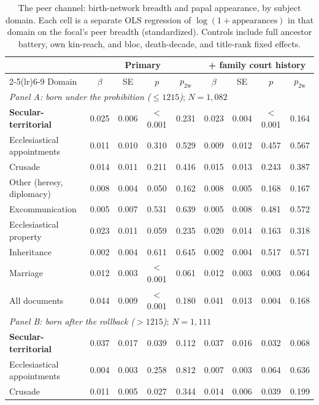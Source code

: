 \documentclass[12pt]{article}
\theoremstyle{definition}
\theoremstyle{remark}
\begin{document}
\begin{table}[!t]
\centering
\caption{The peer channel: birth-network breadth and papal appearance, by subject domain. Each cell is a separate OLS regression of $\log(1+\text{appearances})$ in that domain on the focal's peer breadth (standardized). Controls include full ancestor battery, own kin-reach, and bloc, death-decade, and title-rank fixed effects.}
\label{tab:peer_rf}
{\small
\begin{tabular}{lcccccccc}
\toprule
 & \multicolumn{4}{c}{Primary} & \multicolumn{4}{c}{+ family court history} \\
\cmidrule(lr){2-5}\cmidrule(lr){6-9}
Domain & $\beta$ & SE & $p$ & $p_{\text{2w}}$ & $\beta$ & SE & $p$ & $p_{\text{2w}}$ \\
\midrule
\multicolumn{9}{l}{\textit{Panel A: born under the prohibition ($\leq 1215$)}; $N = 1,082$} \\ \addlinespace
\textbf{Secular-territorial} & 0.025 & 0.006 & $<$0.001 & 0.231 & 0.023 & 0.004 & $<$0.001 & 0.164 \\
Ecclesiastical appointments & 0.011 & 0.010 & 0.310 & 0.529 & 0.009 & 0.012 & 0.457 & 0.567 \\
Crusade & 0.014 & 0.011 & 0.211 & 0.416 & 0.015 & 0.013 & 0.243 & 0.387 \\
Other (heresy, diplomacy) & 0.008 & 0.004 & 0.050 & 0.162 & 0.008 & 0.005 & 0.168 & 0.167 \\
Excommunication & 0.005 & 0.007 & 0.531 & 0.639 & 0.005 & 0.008 & 0.481 & 0.572 \\
Ecclesiastical property & 0.023 & 0.011 & 0.059 & 0.235 & 0.020 & 0.014 & 0.163 & 0.318 \\
Inheritance & 0.002 & 0.004 & 0.611 & 0.645 & 0.002 & 0.004 & 0.517 & 0.571 \\
Marriage & 0.012 & 0.003 & $<$0.001 & 0.061 & 0.012 & 0.003 & 0.003 & 0.064 \\
All documents & 0.044 & 0.009 & $<$0.001 & 0.180 & 0.041 & 0.013 & 0.004 & 0.168 \\
\midrule
\multicolumn{9}{l}{\textit{Panel B: born after the rollback ($> 1215$)}; $N = 1,111$} \\ \addlinespace
\textbf{Secular-territorial} & 0.037 & 0.017 & 0.039 & 0.112 & 0.037 & 0.016 & 0.032 & 0.068 \\
Ecclesiastical appointments & 0.004 & 0.003 & 0.258 & 0.812 & 0.007 & 0.003 & 0.064 & 0.636 \\
Crusade & 0.011 & 0.005 & 0.027 & 0.344 & 0.014 & 0.006 & 0.039 & 0.199 \\

\end{tabular}}
\end{table}
\end{document}

